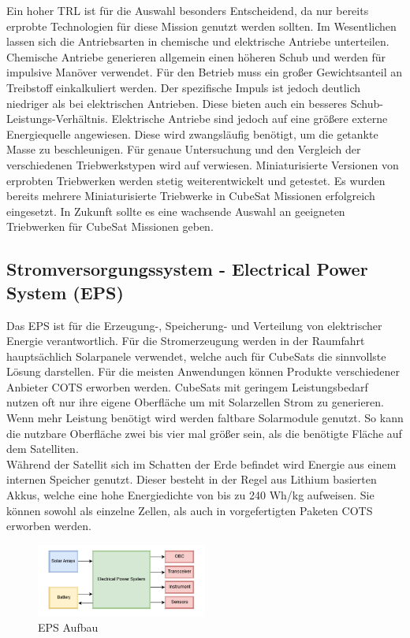 Ein hoher TRL ist für die Auswahl besonders Entscheidend, da nur bereits erprobte Technologien für diese Mission genutzt werden sollten.
Im Wesentlichen lassen sich die Antriebsarten in chemische und elektrische Antriebe unterteilen.  Chemische Antriebe generieren allgemein einen höheren Schub und werden für impulsive Manöver verwendet. Für den Betrieb muss ein großer Gewichtsanteil an Treibstoff einkalkuliert werden. Der spezifische Impuls ist jedoch deutlich niedriger als bei elektrischen Antrieben. Diese bieten auch ein besseres Schub-Leistungs-Verhältnis. Elektrische Antriebe sind jedoch auf eine größere externe Energiequelle angewiesen. Diese wird zwangsläufig benötigt, um die getankte Masse zu beschleunigen. \cite{Lettau.}
Für genaue Untersuchung und den Vergleich der verschiedenen Triebwerkstypen wird auf \cite{Lettau.} verwiesen. Miniaturisierte Versionen von erprobten Triebwerken werden stetig weiterentwickelt und getestet. Es wurden bereits mehrere Miniaturisierte Triebwerke in CubeSat Missionen erfolgreich eingesetzt. In Zukunft sollte es eine wachsende Auswahl an geeigneten Triebwerken für CubeSat Missionen geben. 

		\subsection{Stromversorgungssystem - Electrical Power System (EPS)}%
Das EPS ist für die Erzeugung-, Speicherung- und Verteilung von elektrischer Energie verantwortlich. 
Für die Stromerzeugung werden in der Raumfahrt hauptsächlich Solarpanele verwendet, welche auch für CubeSats die sinnvollste Lösung darstellen.
Für die meisten Anwendungen können Produkte verschiedener Anbieter COTS erworben werden. CubeSats mit geringem Leistungsbedarf nutzen oft nur ihre eigene Oberfläche um mit Solarzellen Strom zu generieren. Wenn mehr Leistung benötigt wird werden faltbare Solarmodule genutzt. So kann die nutzbare Oberfläche zwei bis vier mal größer sein, als die benötigte Fläche auf dem Satelliten.\cite{Lettau.}\\
Während der Satellit sich im Schatten der Erde befindet wird Energie aus einem internen Speicher genutzt. Dieser besteht in der Regel aus Lithium basierten Akkus, welche eine hohe Energiedichte von bis zu 240 Wh/kg aufweisen. Sie können sowohl als einzelne Zellen, als auch in vorgefertigten Paketen COTS erworben werden.\cite{Lettau., Abaker.2017}\\
\begin{figure}[!h]
	\centering
		\includegraphics[width=0.50\textwidth]{./graphics/Struktur_EPS.PNG}
	\caption{EPS Aufbau \cite{Pelgrift.2017}}
\end{figure}
\newpage

